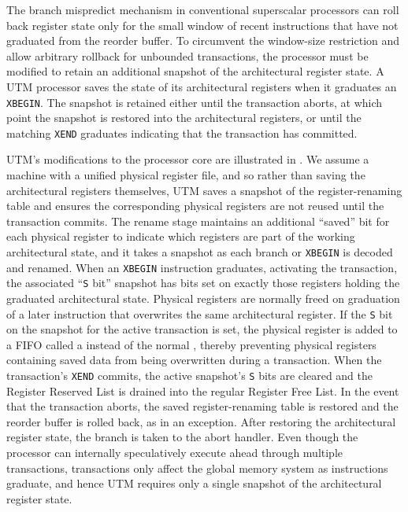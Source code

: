 The branch mispredict mechanism in conventional superscalar processors
can roll back register state only for the small window of recent
instructions that have not graduated from the reorder buffer.  To
circumvent the window-size restriction and allow arbitrary rollback
for unbounded transactions, the processor must be modified to retain
an additional snapshot of the architectural register state.  A UTM
processor saves the state of its architectural registers when it
graduates an \texttt{XBEGIN}\@.  The snapshot is retained either until
the transaction aborts, at which point the snapshot is restored into
the architectural registers, or until the matching \texttt{XEND}
graduates indicating that the transaction has committed.

UTM's modifications to the processor core are illustrated in
.  We assume a machine with a unified physical
register file, and so rather than saving the architectural registers
themselves, UTM saves a snapshot of the register-renaming table
and ensures the corresponding physical registers are not reused until
the transaction commits.
The rename stage maintains an additional ``saved'' bit
for each physical register 
to indicate which registers are part of the working
architectural state, and it takes a snapshot as
each branch or \texttt{XBEGIN} is decoded and renamed.
When an \texttt{XBEGIN} instruction
graduates, activating the transaction, the associated ``\texttt{S} bit''
snapshot has bits set
on exactly those registers holding the graduated architectural state.  Physical
registers are normally freed on graduation of a later instruction that
overwrites the same architectural register.  If the \texttt{S} bit on
the snapshot for the active transaction is
set, the physical register is added to a FIFO called a  instead of the normal , thereby
preventing physical registers containing saved data from being
overwritten during a transaction.  When the
transaction's \texttt{XEND} commits, the active snapshot's \texttt{S}
bits are cleared and the Register
Reserved List is drained into the regular Register Free List.  In the
event that the transaction aborts, the saved register-renaming table
is restored and the reorder buffer is rolled back, as in an exception.
After restoring the architectural register state, the branch is taken
to the abort handler.  Even though the processor can internally
speculatively execute ahead through multiple transactions,
transactions only affect the global memory system as instructions
graduate, and hence UTM requires only a single snapshot of the
architectural register state.

